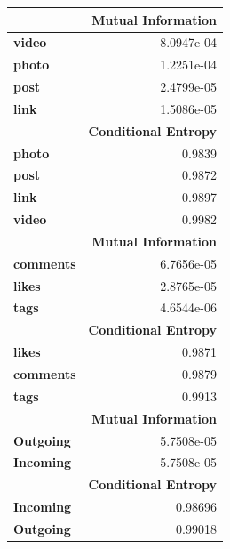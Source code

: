 \begin{table}
	\centering
	\begin{tabular}{| >{\small}l | >{\small}r |}
		\hline
		 & \textbf{Mutual Information}\\
		\hline
		\textbf{video} & 8.0947e-04 \\
		\hline
		\textbf{photo} & 1.2251e-04 \\
		\hline 
		\textbf{post} & 2.4799e-05\\
		\hline
		\textbf{link} & 1.5086e-05\\
		\hline
		\hline
		& \textbf{Conditional Entropy}\\
		\hline
		\textbf{photo} & 0.9839\\
		\hline
		\textbf{post} & 0.9872\\
		\hline
		\textbf{link} & 0.9897\\
		\hline
		\textbf{video} & 0.9982\\
		\hline


		\hline
		 & \textbf{Mutual Information}\\
		\hline
		\textbf{comments} & 6.7656e-05\\
		\hline
		\textbf{likes} & 2.8765e-05 \\
		\hline 
		\textbf{tags} & 4.6544e-06\\
		\hline
		\hline
		& \textbf{Conditional Entropy}\\
		\hline
		\textbf{likes} & 0.9871\\
		\hline
		\textbf{comments} & 0.9879\\
		\hline
		\textbf{tags} & 0.9913\\
		\hline


		\hline
		 & \textbf{Mutual Information}\\
		\hline
		\textbf{Outgoing} & 5.7508e-05\\
		\hline
		\textbf{Incoming} &  5.7508e-05 \\
		\hline 
		\hline
		& \textbf{Conditional Entropy}\\
		\hline
		\textbf{Incoming} & 0.98696\\
		\hline
		\textbf{Outgoing} & 0.99018\\
		\hline
		
	\end{tabular}
\end{table}


